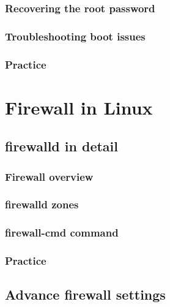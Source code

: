 \documentclass[14pt,fleqn]{extbook} %
\begin{document}
\subsection{Recovering the root password}

\subsection{Troubleshooting boot issues}

\subsection{Practice}



\chapter{Firewall in Linux}
\section{firewalld in detail}

\subsection{Firewall overview}

\subsection{firewalld zones}

\subsection{firewall-cmd command}

\subsection{Practice}
%
\section{Advance firewall settings}

\end{document}
